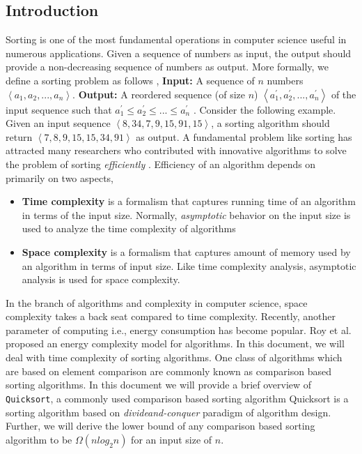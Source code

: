 \documentclass[10pt]{article}
\begin{document}
\begin{multicols*}{2}
\section{Introduction}
Sorting is one of the most fundamental operations
in computer science useful in numerous applications.
Given a sequence of numbers as input, the
output should provide a non-decreasing sequence
of numbers as output. More formally, we define a
sorting problem as follows \cite{cormen2009introduction}, \newline
\textbf{Input:} A sequence of $n$ numbers $ \left \langle a_1, a_2, ..., a_n \right \rangle $.
\newline
\textbf{Output:} A reordered sequence (of size $n$) $\left \langle a_1^{'}, a_2^{'}, ..., a_{n}^{'} \right \rangle $ of the input sequence such that $  a_1^{'} \leq a_2^{'} \leq ... \leq a_{n}^{'}$
. \newline Consider the following example. Given an input
sequence $\left \langle 8, 34, 7, 9, 15, 91, 15 \right \rangle$, a sorting algorithm
should return $ \left \langle 7, 8, 9, 15, 15, 34, 91 \right \rangle$ as output.
\newline
A fundamental problem like sorting has attracted
many researchers who contributed with innovative
algorithms to solve the problem of sorting \textit{efficiently} \cite{martin1971sorting}. Efficiency of an algorithm depends on
primarily on two aspects,
\begin{itemize}
\item \textbf{Time complexity} is a formalism that captures
running time of an algorithm in terms of the input size. Normally, \textit{asymptotic} behavior on the input size is used to analyze the time complexity of algorithms
\item \textbf{Space complexity} is a formalism that captures
amount of memory used by an algorithm
in terms of input size. Like time complexity
analysis, asymptotic analysis is used for space
complexity.
\end{itemize}

In the branch of algorithms and complexity in computer
science, space complexity takes a back seat
compared to time complexity. Recently, another
parameter of computing i.e., energy consumption
has become popular. Roy et al. \cite{roy2013energy} proposed an energy
complexity model for algorithms. In this document,
we will deal with time complexity of sorting
algorithms.\newline
One class of algorithms which are based on element
comparison are commonly known as comparison
based sorting algorithms. In this document we
will provide a brief overview of \texttt{Quicksort}, a commonly
used comparison based sorting algorithm \cite{hoare1961algorithm} Quicksort is a sorting algorithm based on \textit{divideand-conquer}
paradigm of algorithm design. Further,
we will derive the lower bound of any comparison
based sorting algorithm to be $\Omega(n log_2 n) $
for an input size of $n$.


\end{multicols*}
\end{document}
